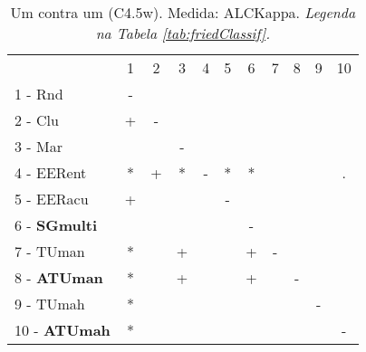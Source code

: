 \begin{table}[h]
\caption{Um contra um (C4.5w). Medida: ALCKappa. \textit{Legenda na Tabela \ref{tab:friedClassif}.}}
\begin{center}\begin{tabular}{lcc|cc|cc|cc|cc}
 			& 1 & 2 & 3 & 4 & 5 & 6 & 7 & 8 & 9 & 10\\
1 - Rnd  	& - &   &   &   &   &   &   &   &   &   \\
2 - Clu  	& + & - &   &   &   &   &   &   &   &   \\ \hline
3 - Mar  	&   &   & - &   &   &   &   &   &   &   \\
4 - EERent	& * & + & * & - & * & * &   &   &   & . \\ \hline
5 - EERacu	& + &   &   &   & - &   &   &   &   &   \\
6 - \textbf{SGmulti}	&   &   &   &   &   & - &   &   &   &   \\ \hline
7 - TUman	& * &   & + &   &   & + & - &   &   &   \\
8 - \textbf{ATUman}	& * &   & + &   &   & + &   & - &   &   \\ \hline
9 - TUmah	& * &   &   &   &   &   &   &   & - &   \\
10 - \textbf{ATUmah}	& * &   &   &   &   &   &   &   &   & - \\ \hline\end{tabular}
\label{stratsALCKappaFriedC4.5wRedux}
\end{center}
\end{table}